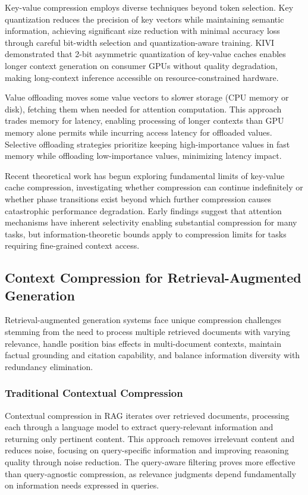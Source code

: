 \documentclass[11pt,letterpaper]{article}
\begin{document}
Key-value compression employs diverse techniques beyond token selection. Key quantization reduces the precision of key vectors while maintaining semantic information, achieving significant size reduction with minimal accuracy loss through careful bit-width selection and quantization-aware training. KIVI demonstrated that 2-bit asymmetric quantization of key-value caches enables longer context generation on consumer GPUs without quality degradation, making long-context inference accessible on resource-constrained hardware.

Value offloading moves some value vectors to slower storage (CPU memory or disk), fetching them when needed for attention computation. This approach trades memory for latency, enabling processing of longer contexts than GPU memory alone permits while incurring access latency for offloaded values. Selective offloading strategies prioritize keeping high-importance values in fast memory while offloading low-importance values, minimizing latency impact.

Recent theoretical work has begun exploring fundamental limits of key-value cache compression, investigating whether compression can continue indefinitely or whether phase transitions exist beyond which further compression causes catastrophic performance degradation. Early findings suggest that attention mechanisms have inherent selectivity enabling substantial compression for many tasks, but information-theoretic bounds apply to compression limits for tasks requiring fine-grained context access.

\subsection{Context Compression for Retrieval-Augmented Generation}

Retrieval-augmented generation systems face unique compression challenges stemming from the need to process multiple retrieved documents with varying relevance, handle position bias effects in multi-document contexts, maintain factual grounding and citation capability, and balance information diversity with redundancy elimination.

\subsubsection{Traditional Contextual Compression}

Contextual compression in RAG iterates over retrieved documents, processing each through a language model to extract query-relevant information and returning only pertinent content. This approach removes irrelevant content and reduces noise, focusing on query-specific information and improving reasoning quality through noise reduction. The query-aware filtering proves more effective than query-agnostic compression, as relevance judgments depend fundamentally on information needs expressed in queries.
\end{document}
